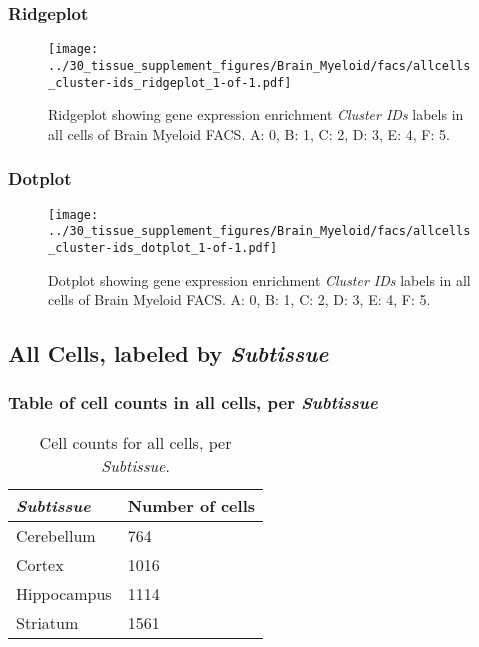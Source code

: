 \clearpage

\subsubsection{Ridgeplot}
\begin{figure}[h]
\centering
\texttt{[image: ../30\_tissue\_supplement\_figures/Brain\_Myeloid/facs/allcells\_cluster-ids\_ridgeplot\_1-of-1.pdf]}

\caption{ Ridgeplot  showing gene expression enrichment \emph{Cluster IDs} labels in all cells of Brain Myeloid FACS. A: 0, B: 1, C: 2, D: 3, E: 4, F: 5.}
\end{figure}


\clearpage

\subsubsection{Dotplot}
\begin{figure}[h]
\centering
\texttt{[image: ../30\_tissue\_supplement\_figures/Brain\_Myeloid/facs/allcells\_cluster-ids\_dotplot\_1-of-1.pdf]}

\caption{ Dotplot  showing gene expression enrichment \emph{Cluster IDs} labels in all cells of Brain Myeloid FACS. A: 0, B: 1, C: 2, D: 3, E: 4, F: 5.}
\end{figure}


\clearpage

\subsection{All Cells, labeled by \emph{Subtissue}}
\subsubsection{Table of cell counts in all cells, per \emph{Subtissue}}\begin{table}[h]
\centering
\label{my-label}
\begin{tabular}{@{}ll@{}}
\toprule

\emph{Subtissue}& Number of cells \\ \midrule
Cerebellum & 764 \\

Cortex & 1016 \\

Hippocampus & 1114 \\

Striatum & 1561 \\
\bottomrule
\end{tabular}
\caption{Cell counts for all cells, per \emph{Subtissue}.}
\end{table}

